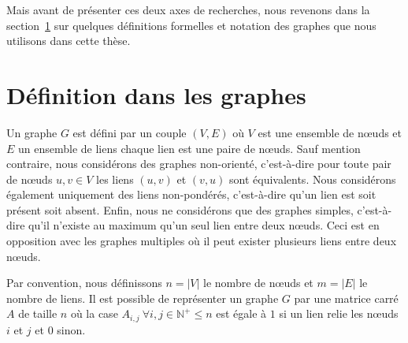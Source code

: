 Mais avant de présenter ces deux axes de recherches, nous revenons dans la section~\ref{sec:def_graphe} sur quelques définitions formelles et notation des graphes que nous utilisons dans cette thèse.
\section{Définition dans les graphes}
\label{sec:def_graphe}

Un graphe $G$ est défini par un couple $(V, E)$  où $V$ est une ensemble de n\oe uds et $E$ un ensemble de liens chaque lien est une paire de n\oe uds.
Sauf mention contraire, nous considérons des graphes non-orienté, c'est-à-dire pour toute pair de n\oe uds $u,v \in V$ les liens $(u,v)$ et $(v,u)$ sont équivalents.
Nous considérons également uniquement des liens non-pondérés, c'est-à-dire qu'un lien est soit présent soit absent.
Enfin, nous ne considérons que des graphes simples, c'est-à-dire qu'il n'existe au maximum qu'un seul lien entre deux n\oe uds.
Ceci est en opposition avec les graphes multiples où il peut exister plusieurs liens entre deux n\oe uds.

Par convention, nous définissons $n=|V|$ le nombre de n\oe uds et $m=|E|$ le nombre de liens.
Il est possible de représenter un graphe $G$ par une matrice carré $A$ de taille $n$ où la case $A_{i,j} \ \forall i,j \in \mathbb{N}^+ \leq n$ est égale à $1$ si un lien relie les n\oe uds $i$ et $j$ et $0$ sinon.

